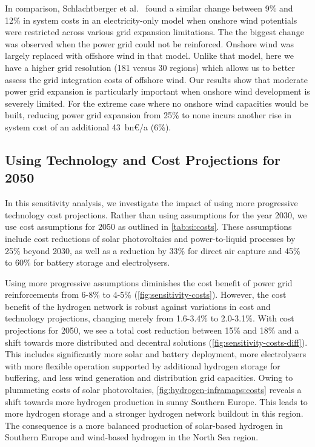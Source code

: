 In comparison, Schlachtberger et al.~ found
a similar change between 9\% and 12\% in system costs in an electricity-only
model when onshore wind potentials were restricted across various grid expansion
limitations. The the biggest change was observed when the power grid could not
be reinforced. Onshore wind was largely replaced with offshore wind in that
model. Unlike that model, here we have a higher grid resolution (181 versus 30
regions) which allows us to better assess the grid integration costs of offshore
wind. Our results show that moderate power grid expansion is particularly
important when onshore wind development is severely limited. For the extreme
case where no onshore wind capacities would be built, reducing power grid
expansion from 25\% to none incurs another rise in system cost of an additional
43~bn\euro/a (6\%).

\subsection{Using Technology and Cost Projections for 2050}
\label{sec:si:sensitivity-costs}

In this sensitivity analysis, we investigate the impact of using more
progressive technology cost projections.
Rather than using assumptions for the year 2030, we use cost assumptions for
2050 as outlined in \cref{tab:si:costs}. These assumptions include cost
reductions of solar photovoltaics and power-to-liquid processes by 25\% beyond
2030, as well as a reduction by 33\% for direct air capture and 45\% to 60\% for
battery storage and electrolysers.

Using more progressive assumptions diminishes the cost benefit of power grid
reinforcements from 6-8\% to 4-5\% (\cref{fig:sensitivity-costs}). However, the
cost benefit of the hydrogen network is robust against variations in cost and
technology projections, changing merely from 1.6-3.4\% to 2.0-3.1\%. With cost
projections for 2050, we see a total cost reduction between 15\% and 18\% and a
shift towards more distributed and decentral solutions
(\cref{fig:sensitivity-costs-diff}). This includes significantly more solar and
battery deployment, more electrolysers with more flexible operation supported by
additional hydrogen storage for buffering, and less wind generation and
distribution grid capacities. Owing to plummeting costs of solar photovoltaics,
\cref{fig:hydrogen-inframaps:costs} reveals a shift towards more hydrogen
production in sunny Southern Europe. This leads to more hydrogen storage and a
stronger hydrogen network buildout in this region. The consequence is a more
balanced production of solar-based hydrogen in Southern Europe and wind-based
hydrogen in the North Sea region.

